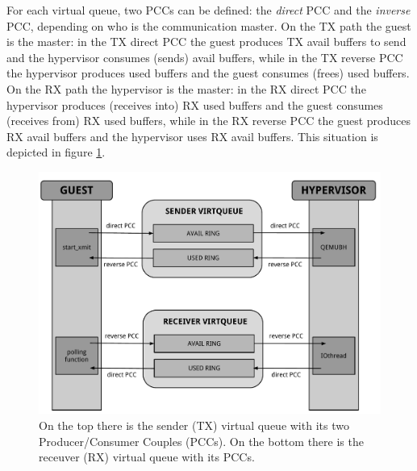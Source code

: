 \vspace{0.5cm}

For each virtual queue, two PCCs can be defined: the \emph{direct} PCC and the \emph{inverse} PCC, depending on who is the communication
master.
On the TX path the guest is the master: in the TX direct PCC the guest produces TX avail buffers to send and the hypervisor consumes (sends)
avail buffers, while in the TX reverse PCC the hypervisor produces used buffers and the guest consumes (frees) used buffers.
On the RX path the hypervisor is the master: in the RX direct PCC the hypervisor produces (receives into) RX used buffers and the guest
consumes (receives from) RX used buffers, while in the RX reverse PCC the guest produces RX avail buffers and the hypervisor uses RX
avail buffers. This situation is depicted in figure \ref{fig:pccs}.

\begin{figure}[bt]
\centering
\includegraphics[scale = 0.55]{pccs.pdf}
\caption{On the top there is the sender (TX) virtual queue with its two Producer/Consumer Couples (PCCs). On the bottom there is the
	 receuver (RX) virtual queue with its PCCs.}
\label{fig:pccs}
\end{figure}


